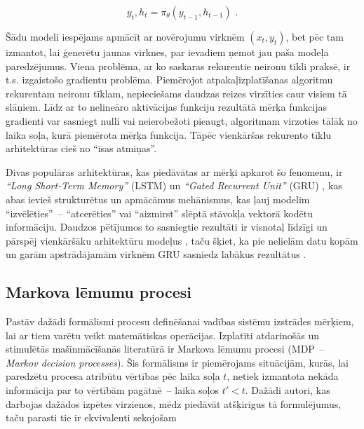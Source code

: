 \documentclass[12pt, a4paper]{article}
\numberwithin{equation}{section} %
\begin{document}
\begin{equation} 
    y_t, h_t = \pi_{\theta}(y_{t-1}, h_{t-1})
    \text{ .}
\end{equation}

Šādu modeli iespējams apmācīt ar novērojumu virknēm $(x_t,y_t)$, bet pēc tam izmantot, lai ģenerētu jaunas virknes, par ievadiem ņemot jau paša modeļa paredzējumus. Viena problēma, ar ko saskaras rekurentie neironu tīkli praksē, ir t.s. izgaistošo gradientu problēma. Piemērojot atpakaļizplatīšanas algoritmu rekurentam neironu tīklam, nepieciešams daudzas reizes virzīties caur visiem tā slāņiem. Līdz ar to nelineāro aktivācijas funkciju rezultātā mērķa funkcijas gradienti var sasniegt nulli vai neierobežoti pieaugt, algoritmam virzoties tālāk no laika soļa, kurā piemērota mērķa funkcija. Tāpēc vienkāršas rekurento tīklu arhitektūras cieš no ``īsas atmiņas''. 

Divas populāras arhitektūras, kas piedāvātas ar mērķi apkarot šo fenomenu, ir \textit{``Long Short-Term Memory''} (LSTM) \cite{hochreiter1997long} un \textit{``Gated Recurrent Unit''} (GRU) \cite{cho2014properties}, kas abas ievieš strukturētus un apmācāmus mehānismus, kas ļauj modelim ``izvēlēties''~-- ``atcerēties'' vai ``aizmirst'' slēptā stāvokļa vektorā kodētu informāciju. Daudzos pētījumos to sasniegtie rezultāti ir visnotaļ līdzīgi un pārspēj vienkāršāku arhitektūru modeļus \cite{chung2014empirical}, taču šķiet, ka pie nelielām datu kopām un garām apstrādājamām virknēm GRU sasniedz labākus rezultātus \cite{yang2020lstm}.

\subsection{Markova lēmumu procesi}

Pastāv dažādi formālismi procesu definēšanai vadības sistēmu izstrādes mērķiem, lai ar tiem varētu veikt matemātiskas operācijas. Izplatīti atdarinošās un stimulētās mašīnmācīšanās literatūrā ir Markova lēmumu procesi (MDP~-- \textit{Markov decision processes}). Šis formālisms ir piemērojams  situācijām, kurās, lai paredzētu procesa atribūtu vērtības pēc laika soļa $t$, netiek izmantota nekāda informācija par to vērtībām pagātnē~-- laika soļos $t' < t$. Dažādi autori, kas darbojas dažādos izpētes virzienos, mēdz piedāvāt atšķirīgus tā formulējumus, taču parasti tie ir ekvivalenti sekojošam \cite{attia2018global}
\end{document}
